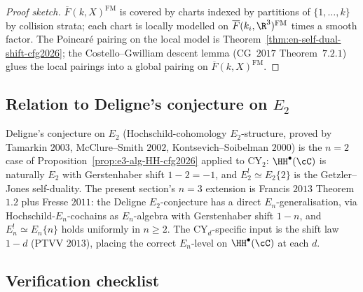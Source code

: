 \begin{proof}[Proof sketch]
$\overline{F}(k, X)^{\mathrm{FM}}$ is covered by charts indexed by
partitions of $\{1, \ldots, k\}$ by collision strata; each chart is
locally modelled on $\overline{F}(k_i, \R^3)^{\mathrm{FM}}$ times a
smooth factor. The Poincar\'e pairing on the local model is
Theorem~\textup{\ref{thm:en-self-dual-shift-cfg2026}}; the
Costello--Gwilliam descent lemma (CG~$2017$ Theorem~$7.2.1$) glues
the local pairings into a global pairing on
$\overline{F}(k, X)^{\mathrm{FM}}$.
\end{proof}

\subsection*{Relation to Deligne's conjecture on $E_2$}

\begin{remark}[Deligne at $n = 2$, the $n = 3$ extension]
\label{rem:deligne-e2-e3-extension-cfg2026}
Deligne's conjecture on $E_2$ (Hochschild-cohomology $E_2$-structure,
proved by Tamarkin $2003$, McClure--Smith $2002$, Kontsevich--Soibelman
$2000$) is the $n = 2$ case of
Proposition~\textup{\ref{prop:e3-alg-HH-cfg2026}} applied to CY$_2$:
$\HH^\bullet(\cC)$ is naturally $E_2$ with Gerstenhaber shift
$1 - 2 = -1$, and $E_2^! \simeq E_2\{2\}$ is the Getzler--Jones
self-duality. The present section's $n = 3$ extension is Francis
$2013$ Theorem $1.2$ plus Fresse $2011$: the Deligne $E_2$-conjecture
has a direct $E_n$-generalisation, via Hochschild-$E_n$-cochains as
$E_n$-algebra with Gerstenhaber shift $1 - n$, and $E_n^! \simeq E_n\{n\}$
holds uniformly in $n \geq 2$. The CY$_d$-specific input is the
shift law $1 - d$ (PTVV $2013$), placing the correct $E_n$-level on
$\HH^\bullet(\cC)$ at each $d$.
\end{remark}

\subsection*{Verification checklist}

